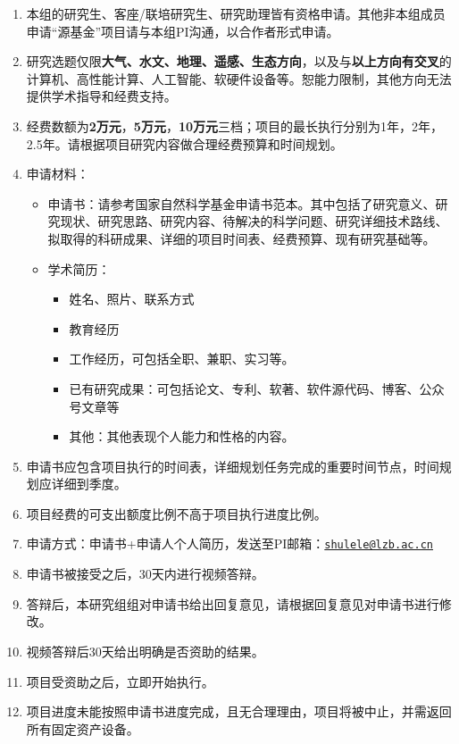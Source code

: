 \documentclass[
]{ctexbook}
\providecommand{\tightlist}{%
  \setlength{\itemsep}{0pt}\setlength{\parskip}{0pt}}
\begin{document}
\begin{enumerate}
\def\labelenumi{\arabic{enumi}.}
\tightlist
\item
  本组的研究生、客座/联培研究生、研究助理皆有资格申请。其他非本组成员申请``源基金''项目请与本组PI沟通，以合作者形式申请。
\item
  研究选题仅限\textbf{大气、水文、地理、遥感、生态方向}，以及与\textbf{以上方向有交叉}的计算机、高性能计算、人工智能、软硬件设备等。恕能力限制，其他方向无法提供学术指导和经费支持。
\item
  经费数额为\textbf{2万元}，\textbf{5万元}，\textbf{10万元}三档；项目的最长执行分别为1年，2年，2.5年。请根据项目研究内容做合理经费预算和时间规划。
\item
  申请材料：

  \begin{itemize}
  \tightlist
  \item
    申请书：请参考国家自然科学基金申请书范本。其中包括了研究意义、研究现状、研究思路、研究内容、待解决的科学问题、研究详细技术路线、拟取得的科研成果、详细的项目时间表、经费预算、现有研究基础等。
  \item
    学术简历：

    \begin{itemize}
    \tightlist
    \item
      姓名、照片、联系方式
    \item
      教育经历
    \item
      工作经历，可包括全职、兼职、实习等。
    \item
      已有研究成果：可包括论文、专利、软著、软件源代码、博客、公众号文章等
    \item
      其他：其他表现个人能力和性格的内容。
    \end{itemize}
  \end{itemize}
\item
  申请书应包含项目执行的时间表，详细规划任务完成的重要时间节点，时间规划应详细到季度。
\item
  项目经费的可支出额度比例不高于项目执行进度比例。
\item
  申请方式：申请书+申请人个人简历，发送至PI邮箱：\href{mailto:shulele@lzb.ac.cn}{\nolinkurl{shulele@lzb.ac.cn}}
\item
  申请书被接受之后，30天内进行视频答辩。
\item
  答辩后，本研究组组对申请书给出回复意见，请根据回复意见对申请书进行修改。
\item
  视频答辩后30天给出明确是否资助的结果。
\item
  项目受资助之后，立即开始执行。
\item
  项目进度未能按照申请书进度完成，且无合理理由，项目将被中止，并需返回所有固定资产设备。
\end{enumerate}
\end{document}
